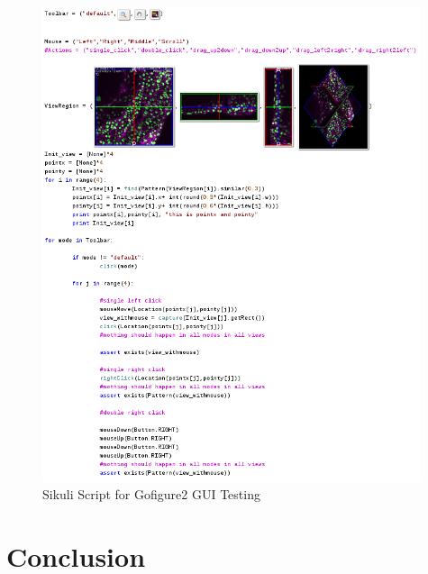 \documentclass{InsightArticle}
\begin{document}
\begin{figure}[htp]
 \centering
 \includegraphics[width=0.99\textwidth]{Images/Gofigure2Example.png}
 \caption{Sikuli Script for Gofigure2 GUI Testing}
 \label{fig:Gofigure2Example}
\end{figure}
\section{Conclusion}

\clearpage



\end{document}
